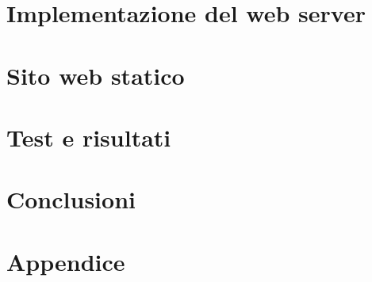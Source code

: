 \documentclass[a4paper,12pt]{report}
\begin{document}
\chapter{Implementazione del web server}

\chapter{Sito web statico}

\chapter{Test e risultati}

\chapter{Conclusioni}

\chapter{Appendice}
\end{document}

